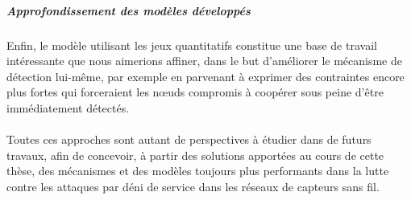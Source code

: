         \vspace{-1em}
        \subparagraph{Approfondissement des modèles développés}
Enfin, le modèle utilisant les jeux quantitatifs constitue une base de travail intéressante que nous aimerions affiner, dans le but d'améliorer le mécanisme de détection lui-même, par exemple en parvenant à exprimer des contraintes encore plus fortes qui forceraient les nœuds compromis à coopérer sous peine d'être immédiatement détectés.

    \vspace{1em}
    \paragraph{}
Toutes ces approches sont autant de perspectives à étudier dans de futurs travaux, afin de concevoir, à partir des solutions apportées au cours de cette thèse, des mécanismes et des modèles toujours plus performants dans la lutte contre les attaques par déni de service dans les réseaux de capteurs sans fil.
\pagebreak
